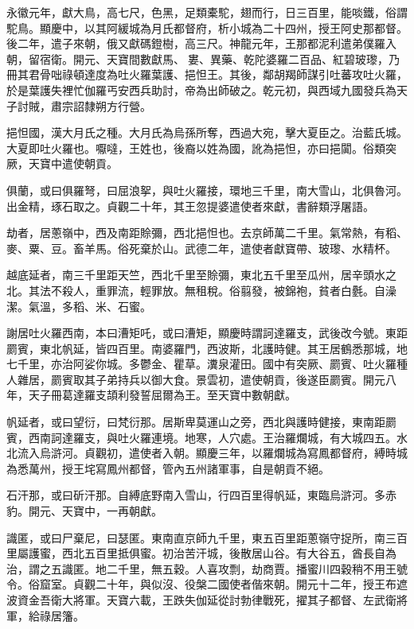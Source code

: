 \begin{pinyinscope}
 永徽元年，獻大鳥，高七尺，色黑，足類橐駝，翅而行，日三百里，能啖鐵，俗謂駝鳥。顯慶中，以其阿緩城為月氏都督府，析小城為二十四州，授王阿史那都督。後二年，遣子來朝，俄又獻碼鐙樹，高三尺。神龍元年，王那都泥利遣弟僕羅入朝，留宿衛。開元、天寶間數獻馬、婁、異藥、乾陀婆羅二百品、紅碧玻瓈，乃冊其君骨咄祿頓達度為吐火羅葉護、挹怛王。其後，鄰胡羯師謀引吐蕃攻吐火羅，於是葉護失裡忙伽羅丐安西兵助討，帝為出師破之。乾元初，與西域九國發兵為天子討賊，肅宗詔隸朔方行營。



 挹怛國，漢大月氏之種。大月氏為烏孫所奪，西過大宛，擊大夏臣之。治藍氏城。大夏即吐火羅也。嚈噠，王姓也，後裔以姓為國，訛為挹怛，亦曰挹闐。俗類突厥，天寶中遣使朝貢。



 俱蘭，或曰俱羅弩，曰屈浪挐，與吐火羅接，環地三千里，南大雪山，北俱魯河。出金精，琢石取之。貞觀二十年，其王忽提婆遣使者來獻，書辭類浮屠語。



 劫者，居蔥嶺中，西及南距賒彌，西北挹怛也。去京師萬二千里。氣常熱，有稻、麥、粟、豆。畜羊馬。俗死棄於山。武德二年，遣使者獻寶帶、玻瓈、水精杯。



 越底延者，南三千里距天竺，西北千里至賒彌，東北五千里至瓜州，居辛頭水之北。其法不殺人，重罪流，輕罪放。無租稅。俗翦發，被錦袍，貧者白氎。自澡潔。氣溫，多稻、米、石蜜。



 謝居吐火羅西南，本曰漕矩吒，或曰漕矩，顯慶時謂訶達羅支，武後改今號。東距罽賓，東北帆延，皆四百里。南婆羅門，西波斯，北護時健。其王居鶴悉那城，地七千里，亦治阿娑你城。多鬱金、瞿草。瀵泉灌田。國中有突厥、罽賓、吐火羅種人雜居，罽賓取其子弟持兵以御大食。景雲初，遣使朝貢，後遂臣罽賓。開元八年，天子冊葛達羅支頡利發誓屈爾為王。至天寶中數朝獻。



 帆延者，或曰望衍，曰梵衍那。居斯卑莫運山之旁，西北與護時健接，東南距罽賓，西南訶達羅支，與吐火羅連境。地寒，人穴處。王治羅爛城，有大城四五。水北流入烏滸河。貞觀初，遣使者入朝。顯慶三年，以羅爛城為寫鳳都督府，縛時城為悉萬州，授王垞寫鳳州都督，管內五州諸軍事，自是朝貢不絕。



 石汗那，或曰斫汗那。自縛底野南入雪山，行四百里得帆延，東臨烏滸河。多赤豹。開元、天寶中，一再朝獻。



 識匿，或曰尸棄尼，曰瑟匿。東南直京師九千里，東五百里距蔥嶺守捉所，南三百里屬護蜜，西北五百里抵俱蜜。初治苦汗城，後散居山谷。有大谷五，酋長自為治，謂之五識匿。地二千里，無五穀。人喜攻剽，劫商賈。播蜜川四穀稍不用王號令。俗窟室。貞觀二十年，與似沒、役槃二國使者偕來朝。開元十二年，授王布遮波資金吾衛大將軍。天寶六載，王跌失伽延從討勃律戰死，擢其子都督、左武衛將軍，給祿居籓。




\end{pinyinscope}
